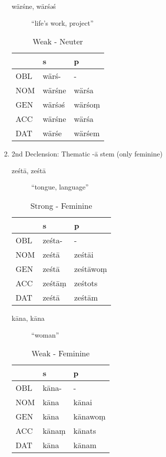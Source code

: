 \documentclass[11pt,a4paper]{article}
\begin{document}
\begin{enumerate}
\begin{description}
\item[{wärśne, wärśəś}] ``life's work, project''
\end{description}
\begin{table}[htbp]
\caption{Weak - Neuter}
\centering
\begin{tabular}{lll}
 & s & p\\
\hline
OBL & wärś- & -\\
NOM & wärśne & wärśa\\
GEN & wärśəś & wärśoṃ\\
ACC & wärśne & wärśa\\
DAT & wärśe & wärśem\\
\end{tabular}
\end{table}

\item 2nd Declension: Thematic -ā stem (only feminine)
\label{sec:orgb91128e}
\begin{description}
\item[{ześtā, ześtā}] ``tongue, language''
\end{description}
\begin{table}[htbp]
\caption{Strong - Feminine}
\centering
\begin{tabular}{lll}
 & s & p\\
\hline
OBL & ześta- & -\\
NOM & ześtā & ześtāi\\
GEN & ześtā & ześtāwoṃ\\
ACC & ześtāṃ & ześtots\\
DAT & ześtā & ześtām\\
\end{tabular}
\end{table}

\begin{description}
\item[{kāna, kāna}] ``woman''
\end{description}
\begin{table}[htbp]
\caption{Weak - Feminine}
\centering
\begin{tabular}{lll}
 & s & p\\
\hline
OBL & kāna- & -\\
NOM & kāna & kānai\\
GEN & kāna & kānawoṃ\\
ACC & kānaṃ & kānats\\
DAT & kāna & kānam\\
\end{tabular}
\end{table}


\end{enumerate}
\end{document}
